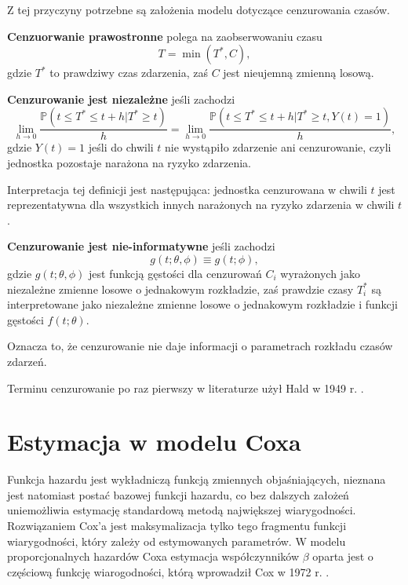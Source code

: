 Z tej przyczyny potrzebne są założenia modelu dotyczące cenzurowania czasów.

\begin{definition}
\textbf{Cenzuorwanie prawostronne} polega na zaobserwowaniu czasu 
$$T= \min(T^*, C),$$
gdzie $T^*$ to prawdziwy czas zdarzenia, zaś $C$ jest nieujemną zmienną losową.
\end{definition}


\begin{definition}
\textbf{Cenzurowanie jest niezależne} jeśli zachodzi
$$ \lim\limits_{h\rightarrow 0}\dfrac{\mathbb{P}(t \leq T^* \leq t +h | T^* \geq t)}{h} =  \lim\limits_{h\rightarrow 0}\dfrac{\mathbb{P}(t \leq T^* \leq t +h | T^* \geq t, Y(t) = 1)}{h},$$
gdzie $Y(t) = 1$ jeśli do chwili $t$ nie wystąpiło zdarzenie ani cenzurowanie, czyli jednostka pozostaje narażona na ryzyko zdarzenia.
\end{definition}

Interpretacja tej definicji jest następująca: jednostka cenzurowana w chwili $t$ jest reprezentatywna dla wszystkich innych narażonych na ryzyko zdarzenia w chwili $t$.

\begin{definition}
\textbf{Cenzurowanie jest nie-informatywne} jeśli zachodzi
$$g(t;\theta, \phi) \equiv g(t;\phi),$$
gdzie $g(t;\theta, \phi)$ jest funkcją gęstości dla cenzurowań $C_i$ wyrażonych jako niezależne zmienne losowe o jednakowym rozkładzie, zaś prawdzie czasy $T^*_i$ są interpretowane jako niezależne zmienne losowe o jednakowym rozkładzie i funkcji gęstości $f(t;\theta)$.
\end{definition}

Oznacza to, że cenzurowanie nie daje informacji o parametrach rozkładu czasów zdarzeń.

Terminu cenzurowanie po raz pierwszy w literaturze użył Hald w 1949 r. \cite{hald}.

\section{Estymacja w modelu Coxa}

Funkcja hazardu jest wykładniczą funkcją zmiennych objaśniających, nieznana jest natomiast
postać bazowej funkcji hazardu, co bez dalszych założeń uniemożliwia estymację standardową
metodą największej wiarygodności. Rozwiązaniem Cox’a jest maksymalizacja tylko tego fragmentu funkcji wiarygodności, który zależy od estymowanych parametrów. W modelu proporcjonalnych hazardów Coxa estymacja współczynników $\beta$ oparta jest o częściową funkcję wiarogodności, którą wprowadził Cox w 1972 r. \cite{cox}. 

